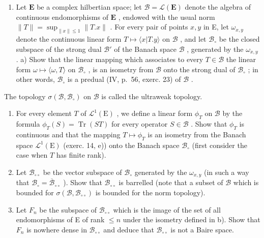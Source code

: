 \begin{enumerate}
\def\labelenumi{\arabic{enumi})}
\setcounter{enumi}{14}
\tightlist
\item
  Let \(\mathbf{E}\) be a complex hilbertian space; let \(\mathcal{B} = \mathcal{L}(\mathbf{E})\) denote the algebra of continuous endomorphisms of \(\mathbf{E}\) , endowed with the usual norm \(\| T\| = \sup_{\| x\| \leqslant 1}\| T.x\|\) . For every pair of points \(x, y\) in E, let \(\omega_{x,y}\) denote the continuous linear form \(T \mapsto \langle x|T.y \rangle\) on \(\mathcal{B}\) , and let \(\mathcal{B}_{\circ}\) be the closed subspace of the strong dual \(\mathcal{B}'\) of the Banach space \(\mathcal{B}\) , generated by the \(\omega_{x,y}\) . a) Show that the linear mapping which associates to every \(T \in \mathcal{B}\) the linear form \(\omega \mapsto \langle \omega, T \rangle\) on \(\mathcal{B}_{\circ}\) , is an isometry from \(\mathcal{B}\) onto the strong dual of \(\mathcal{B}_{\circ}\) ; in other words, \(\mathcal{B}_{\circ}\) is a predual (IV, p.~56, exerc. 23) of \(\mathcal{B}\) .
\end{enumerate}

The topology \(\sigma (\mathcal{B},\mathcal{B}_{\circ})\) on \(\mathcal{B}\) is called the ultraweak topology.

\begin{enumerate}
\def\labelenumi{\alph{enumi})}
\setcounter{enumi}{1}
\item
  For every element \(T\) of \(\mathcal{L}^1(\mathrm{E})\) , we define a linear form \(\phi_T\) on \(\mathcal{B}\) by the formula \(\phi_T(S) = \operatorname{Tr}(ST)\) for every operator \(S \in \mathcal{B}\) . Show that \(\phi_T\) is continuous and that the mapping \(T \mapsto \phi_T\) is an isometry from the Banach space \(\mathcal{L}^1(\mathrm{E})\) (exerc. 14, e)) onto the Banach space \(\mathcal{B}_{\circ}\) (first consider the case when \(T\) has finite rank).
\item
  Let \(\mathcal{B}_{\circ \circ}\) be the vector subspace of \(\mathcal{B}_{\circ}\) generated by the \(\omega_{x,y}\) (in such a way that \(\mathcal{B}_{\circ} = \overline{\mathcal{B}}_{\circ \circ} \) ). Show that \(\mathcal{B}_{\circ \circ}\) is barrelled (note that a subset of \(\mathcal{B}\) which is bounded for \(\sigma (\mathcal{B},\mathcal{B}_{\circ \circ})\) is bounded for the norm topology).
\item
  Let \(F_{n}\) be the subspace of \(\mathcal{B}_{\circ \circ}\) which is the image of the set of all endomorphisms of E of rank \(\leqslant n\) under the isometry defined in b). Show that \(F_{n}\) is nowhere dense in \(\mathcal{B}_{\circ \circ}\) and deduce that \(\mathcal{B}_{\circ \circ}\) is not a Baire space.
\end{enumerate}

